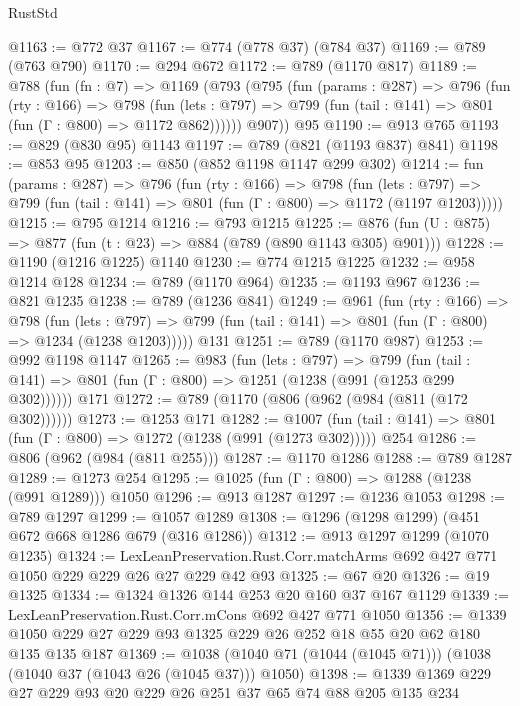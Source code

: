 \begin{lexlean}{RustStd}
\begin{coremodule}
@1163 := @772 @37
@1167 := @774 (@778 @37) (@784 @37)
@1169 := @789 (@763 @790)
@1170 := @294 @672
@1172 := @789 (@1170 @817)
@1189 := @788
    (fun (fn : @7) =>
    @1169
      (@793
        (@795
          (fun (params : @287) =>
          @796
            (fun (rty : @166) =>
            @798
              (fun (lets : @797) =>
              @799 (fun (tail : @141) => @801 (fun (Γ : @800) => @1172 @862))))))
        @907))
    @95
@1190 := @913 @765
@1193 := @829 (@830 @95) @1143
@1197 := @789 (@821 (@1193 @837) @841)
@1198 := @853 @95
@1203 := @850 (@852 @1198 @1147 @299 @302)
@1214 := fun (params : @287) =>
  @796
    (fun (rty : @166) =>
    @798
      (fun (lets : @797) =>
      @799 (fun (tail : @141) => @801 (fun (Γ : @800) => @1172 (@1197 @1203)))))
@1215 := @795 @1214
@1216 := @793 @1215
@1225 := @876 (fun (U : @875) => @877 (fun (t : @23) => @884 (@789 (@890 @1143 @305) @901)))
@1228 := @1190 (@1216 @1225) @1140
@1230 := @774 @1215 @1225
@1232 := @958 @1214 @128
@1234 := @789 (@1170 @964)
@1235 := @1193 @967
@1236 := @821 @1235
@1238 := @789 (@1236 @841)
@1249 := @961
    (fun (rty : @166) =>
    @798
      (fun (lets : @797) =>
      @799 (fun (tail : @141) => @801 (fun (Γ : @800) => @1234 (@1238 @1203)))))
    @131
@1251 := @789 (@1170 @987)
@1253 := @992 @1198 @1147
@1265 := @983
    (fun (lets : @797) =>
    @799 (fun (tail : @141) => @801 (fun (Γ : @800) => @1251 (@1238 (@991 (@1253 @299 @302))))))
    @171
@1272 := @789 (@1170 (@806 (@962 (@984 (@811 (@172 @302))))))
@1273 := @1253 @171
@1282 := @1007
    (fun (tail : @141) => @801 (fun (Γ : @800) => @1272 (@1238 (@991 (@1273 @302)))))
    @254
@1286 := @806 (@962 (@984 (@811 @255)))
@1287 := @1170 @1286
@1288 := @789 @1287
@1289 := @1273 @254
@1295 := @1025 (fun (Γ : @800) => @1288 (@1238 (@991 @1289))) @1050
@1296 := @913 @1287
@1297 := @1236 @1053
@1298 := @789 @1297
@1299 := @1057 @1289
@1308 := @1296 (@1298 @1299) (@451 @672 @668 @1286 @679 (@316 @1286))
@1312 := @913 @1297 @1299 (@1070 @1235)
@1324 := LexLeanPreservation.Rust.Corr.matchArms @692 @427 @771 @1050 @229 @229 @26 @27 @229 @42 @93
@1325 := @67 @20
@1326 := @19 @1325
@1334 := @1324 @1326 @144 @253 @20 @160 @37 @167 @1129
@1339 := LexLeanPreservation.Rust.Corr.mCons @692 @427 @771 @1050
@1356 := @1339 @1050 @229 @27 @229 @93 @1325 @229 @26 @252 @18 @55 @20 @62 @180 @135 @135 @187
@1369 := @1038 (@1040 @71 (@1044 (@1045 @71))) (@1038 (@1040 @37 (@1043 @26 (@1045 @37))) @1050)
@1398 := @1339
    @1369
    @229
    @27
    @229
    @93
    @20
    @229
    @26
    @251
    @37
    @65
    @74
    @88
    @205
    @135
    @234

\end{coremodule}
\end{lexlean}
